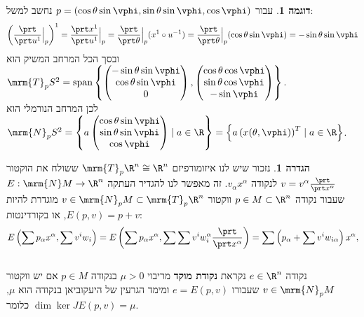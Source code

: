\documentclass{article}
\theoremstyle{definition}
\newtheorem*{definition*}{הגדרה}
\newtheorem*{example*}{דוגמה}
\DeclareMathOperator{\spn}{span}
\begin{document}
	\begin{example*}
		עבור
		\(p=(\cos\theta \sin\vphi, \sin\theta \sin\vphi, \cos\vphi)\)
		נחשב למשל:
		\[
			\left(\frac{\prt}{\prt u^1}\Big|_p\right)^1
			= \frac{\prt x^1}{\prt u^1}\Big|_p
			= \frac{\prt}{\prt \theta}\Big|_p (x^1 \circ u^{-1})
			= \frac{\prt}{\prt \theta}\Big|_p (\cos\theta \sin\vphi)
			= -\sin\theta \sin\vphi
		\]
		ובסך הכל המרחב המשיק הוא
		\(
			\mrm{T}_p S^2
			= \spn\left\{
				\begin{pmatrix}
					-\sin\theta \sin\vphi \\ \cos\theta \sin\vphi \\ 0
				\end{pmatrix},
				\begin{pmatrix}
					\cos\theta \cos\vphi \\ \sin\theta \cos\vphi \\ -\sin\vphi
				\end{pmatrix}
			\right\}
		\).
		\\
		לכן המרחב הנורמלי הוא
		\(
			\mrm{N}_p S^2
			= \left\{
				a
				\begin{pmatrix}
					\cos\theta \sin\vphi \\ \sin\theta \sin\vphi \\ \cos\vphi
				\end{pmatrix}
				\mid
				a \in \R
			\right\}
			= \left\{
				a
				\left(x(\theta, \vphi)\right)^T
				\mid
				a \in \R
			\right\}
		\).
	\end{example*}

	\begin{definition*}
		נזכור שיש לנו איזומורפיזם
		\(\mrm{T}_p \R^n \cong \R^n\)
		ששולח את הוקטור
		\(v = v^\alpha\frac{\prt}{\prt x^\alpha}\)
		לנקודה
		\(v_\alpha x^\alpha\).
		זה מאפשר לנו להגדיר העתקה
		\(E:\mrm{N} M \to \R^n\)
		שעבור נקודה
		\(p \in M \subset \R^n\)
		ווקטור
		\(v \in \mrm{N}_p M \subset \mrm{T}_p \R^n\)
		מוגדרת להיות
		\(E(p,v)=p+v\),
		או בקורדינטות:
		\[
			E\left(\sum p_\alpha x^\alpha,\sum v^i w_i\right)
			=
			E\left(\sum p_\alpha x^\alpha,\sum \sum v^i w_i^\alpha \frac{\prt}{\prt x^\alpha}\right)
			=
			\sum \left(p_\alpha + \sum v^i w_{i\alpha}\right) x^\alpha,
		\]
		\\
		נקודה
		\(e \in \R^n\)
		נקראת \textbf{נקודת מוקד} מריבוי
		\(\mu>0\)
		בנקודה
		\(p \in M\)
		אם יש ווקטור
		\(v \in \mrm{N}_p M\)
		שעבורו
		\(e = E(p,v)\)
		ומימד הגרעין של היעקוביאן בנקודה הוא \(\mu\), כלומר
		\(\dim \ker JE(p,v) = \mu\).
	\end{definition*}
\end{document}

